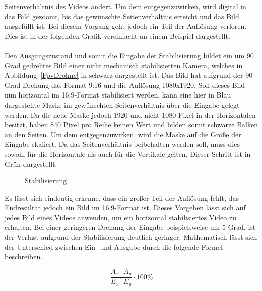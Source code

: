     Seitenverhältnis des Videos ändert. Um dem entgegenzuwirken, wird digital in das Bild gezoomt,
    bis das gewünschte Seitenverhältnis erreicht und das Bild ausgefüllt ist. Bei diesem Vorgang
    geht jedoch ein Teil der Auflösung verloren. Dies ist in der folgenden Grafik vereinfacht an
    einem Beispiel dargestellt. \\
    \\
    Den Ausgangszustand und somit die Eingabe der Stabilisierung bildet ein um 90 Grad gedrehtes
    Bild einer nicht mechanisch stabilisierten Kamera, welches in Abbildung~\ref*{FpvDrohne} in schwarz dargestellt
    ist. Das Bild hat aufgrund der 90 Grad Drehung das Format 9:16 und die Auflösung 1080x1920. Soll
    dieses Bild nun horizontal im 16:9-Format stabilisiert werden, kann eine hier in Blau dargestellte
    Maske im gewünschten Seitenverhältnis über die Eingabe gelegt werden. Da die neue Maske jedoch 1920
    und nicht 1080 Pixel in der Horizontalen besitzt, haben 840 Pixel pro Reihe keinen Wert und bilden
    somit schwarze Balken an den Seiten. Um dem entgegenzuwirken, wird die Maske auf die Größe der
    Eingabe skaliert. Da das Seitenverhältnis beibehalten werden soll, muss dies sowohl für die
    Horizontale als auch für die Vertikale gelten. Dieser Schritt ist in Grün dargestellt.

    \begin{figure}[ht]
        \centering
        \def\svgwidth{\linewidth}
        
        \vspace{0.5cm}
        \caption{Stabilisierung}
        \label{stabilisierung}
    \end{figure}
    
    Es lässt sich eindeutig erkenne, dass ein großer Teil der Auflösung fehlt, das Endresultat jedoch
    ein Bild im 16:9-Format ist. Dieses Vorgehen lässt sich auf jedes Bild eines Videos anwenden, um
    ein horizontal stabilisiertes Video zu erhalten. Bei einer geringeren Drehung der Eingabe beispielsweise
    um 5 Grad, ist der Verlust aufgrund der Stabilisierung deutlich geringer. Mathematisch lässt sich
    der Unterschied zwischen Ein- und Ausgabe durch die folgende Formel beschreiben.

    \begin{equation}
        \frac{A_x \cdot A_y}{E_x \cdot E_y} \cdot 100\%
    \end{equation}

